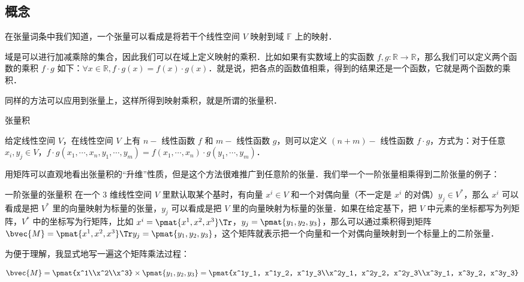 
\subsection{概念}
在张量词条中我们知道，一个张量可以看成是将若干个线性空间 $V$ 映射到域 $\mathbb{F}$ 上的映射．

域是可以进行加减乘除的集合，因此我们可以在域上定义映射的乘积．比如如果有实数域上的实函数 $f, g:\mathbb{R}\rightarrow\mathbb{R}$，那么我们可以定义两个函数的乘积 $f\cdot g$ 如下：$\forall x\in\mathbb{R}, f\cdot g(x)=f(x)\cdot g(x)$．就是说，把各点的函数值相乘，得到的结果还是一个函数，它就是两个函数的乘积．

同样的方法可以应用到张量上，这样所得到映射乘积，就是所谓的张量积．

\begin{definition}{张量积}\label{TsrPrd_def1}

给定线性空间 $V$，在线性空间 $V$ 上有 $n-$ 线性函数 $f$ 和 $m-$ 线性函数 $g$，则可以定义 $(n+m)-$ 线性函数 $f\cdot g$，方式为：对于任意 $x_i, y_j\in V$，$f\cdot g(x_1, \cdots, x_n, y_1, \cdots, y_m)=f(x_1, \cdots, x_n)\cdot g(y_1, \cdots, y_m)$．

\end{definition}

用矩阵可以直观地看出张量积的“升维”性质，但是这个方法很难推广到任意阶的张量．我们举一个一阶张量相乘得到二阶张量的例子：

\begin{example}{一阶张量的张量积}
在一个 $3$ 维线性空间 $V$ 里默认取某个基时，有向量 $x^i\in V$ 和一个对偶向量（不一定是 $x^i$ 的对偶）$y_j\in V^*$，那么 $x^i$ 可以看成是把 $V^*$ 里的向量映射为标量的张量，$y_j$ 可以看成是把 $V$ 里的向量映射为标量的张量．如果在给定基下，把 $V$ 中元素的坐标都写为列矩阵，$V^*$ 中的坐标写为行矩阵，比如 $x^i=\pmat{x^1, x^2, x^3}\Tr$，$y_j=\pmat{y_1, y_2, y_3}$，那么可以通过乘积得到矩阵 $\bvec{M}=\pmat{x^1, x^2, x^3}\Tr y_j=\pmat{y_1, y_2, y_3}$，这个矩阵就表示把一个向量和一个对偶向量映射到一个标量上的二阶张量．

为便于理解，我显式地写一遍这个矩阵乘法过程：

\begin{equation}
\bvec{M}=\pmat{x^1\\x^2\\x^3}\times\pmat{y_1, y_2, y_3}=\pmat{x^1y_1, x^1y_2, x^1y_3\\x^2y_1, x^2y_2, x^2y_3\\x^3y_1, x^3y_2, x^3y_3}
\end{equation}
\end{example}

